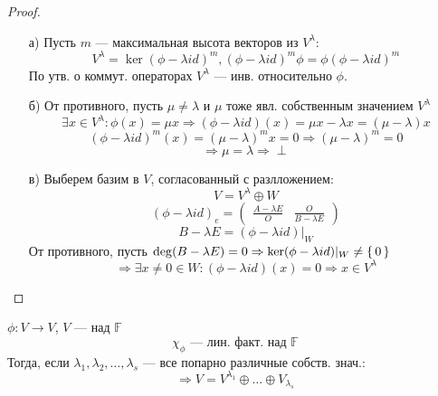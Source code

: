 \begin{proof}
  \begin{itemize}
    \item [а) ] Пусть $m$ --- максимальная высота векторов из $V^{\lambda}$:
      \[
      V^{\lambda} = \ker(\phi - \lambda id)^{m}, (\phi - \lambda id)^{m} \phi = \phi (\phi - \lambda id)^{m}
      \]
      По утв. о коммут. операторах $V^{\lambda}$ --- инв. относительно $\phi$.
    \item [б) ] От противного, пусть $\mu \neq \lambda$ и $\mu$ тоже явл. собственным значением $V^{\lambda}$
      \[
      \exists x \in V^{\lambda} \colon \phi(x) = \mu x \Rightarrow (\phi - \lambda id)(x) = \mu x - \lambda x = (\mu - \lambda) x 
      \]
      \[
        (\phi - \lambda id)^{m}(x) = (\mu - \lambda)^{m}x = 0 \Rightarrow (\mu - \lambda)^{m} = 0
      \]
      \[
       \Rightarrow \mu = \lambda \Rightarrow \perp
      \]
    \item [в) ] Выберем базим в $V$, согласованный с разлложением:
      \[
      V = V^{\lambda} \oplus W
      \]
      \[
        (\phi - \lambda id)_e = \begin{pmatrix} \frac{A - \lambda E}{O} & \frac{O}{B - \lambda E} \end{pmatrix}
      \]
      \[
      B - \lambda E = (\phi - \lambda id)|_{W}
      \]
      От противного, пусть $\deg (B - \lambda E) = 0 \Rightarrow \ker (\phi - \lambda id)|_{W} \neq \set{0}$
      \[
      \Rightarrow \exists x \neq 0 \in W\colon (\phi - \lambda id)(x) = 0 \Rightarrow x \in V^{\lambda}
      \]
  \end{itemize}
\end{proof}
\begin{theorem}
\label{theorem:05_3}
  $\phi \colon V \rightarrow V$, $V$ --- над $\mathbb{F}$
  \[
  \chi_\phi \text{ --- лин. факт. над $\mathbb{F}$}
  \]
  Тогда, если $\lambda_1, \lambda_2, \ldots, \lambda_s$ --- все попарно различные собств. знач.:
  \[
  \Rightarrow V = V^{\lambda_1} \oplus \ldots \oplus V_{\lambda_s}
  \]
\end{theorem}
